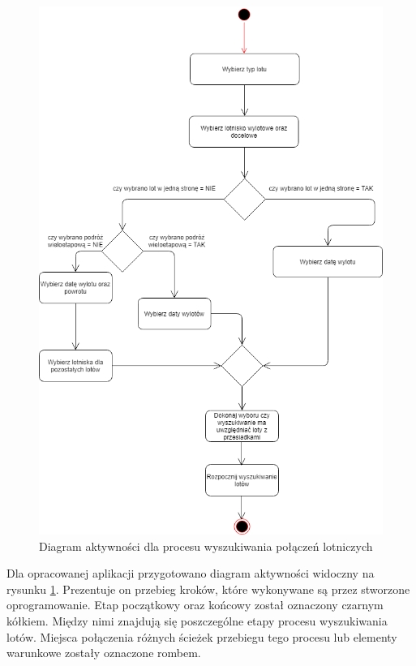 \documentclass[12pt, twoside]{report}
\begin{document}
\begin{figure}[!ht]
\centering
\includegraphics[scale=0.56, keepaspectratio]{activity_diagram.png}
\caption{Diagram aktywności dla procesu wyszukiwania połączeń lotniczych}
\label{fig:activity_diagram}
\end{figure}

Dla opracowanej aplikacji przygotowano diagram aktywności widoczny na rysunku \ref{fig:activity_diagram}. Prezentuje on przebieg kroków, które wykonywane są przez stworzone oprogramowanie. Etap początkowy oraz końcowy został oznaczony czarnym kółkiem. Między nimi znajdują się poszczególne etapy procesu wyszukiwania lotów. Miejsca połączenia różnych ścieżek przebiegu tego procesu lub elementy warunkowe zostały oznaczone rombem.
\end{document}
